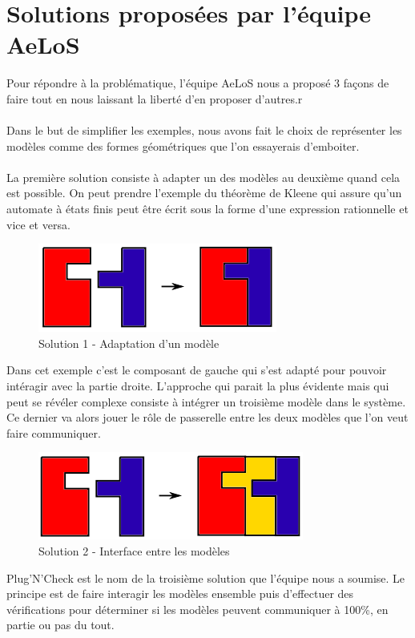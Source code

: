 \documentclass[12pt,a4paper]{report}
\begin{document}
\section{Solutions proposées par l'équipe AeLoS}\label{sec:Solutions}
Pour répondre à la problématique, l'équipe AeLoS nous a proposé 3 façons de 
faire tout en nous laissant la liberté d'en proposer d'autres.r
\\\\
Dans le but de simplifier les exemples, nous avons fait le choix de représenter 
les modèles comme des formes géométriques que l'on essayerais d'emboiter.
\\\\
La première solution consiste à adapter un des modèles au deuxième quand cela 
est possible. On peut prendre l'exemple du théorème de Kleene qui assure qu'un 
automate à états finis peut être écrit sous la forme d'une expression 
rationnelle et vice et versa.

\begin{figure}[h]
	\centering
	\includegraphics[scale=1]{ressources/solution1.png}
	\caption{Solution 1 - Adaptation d'un modèle}
\end{figure}

Dans cet exemple c'est le composant de gauche qui s'est adapté pour pouvoir intéragir
avec la partie droite.
\newpage
L'approche qui parait la plus évidente mais qui peut se révéler complexe 
consiste à intégrer un troisième modèle dans le système. Ce dernier va alors 
jouer le rôle de passerelle entre les deux modèles que l'on veut faire 
communiquer.

\begin{figure}[h]
	\centering
	\includegraphics[scale=1]{ressources/solution2.png}
	\caption{Solution 2 - Interface entre les modèles}
\end{figure}

Plug'N'Check est le nom de la troisième solution que l'équipe nous a soumise. 
Le principe est de faire interagir les modèles ensemble puis d'effectuer des 
vérifications pour déterminer si les modèles peuvent communiquer à 100\%, 
en partie ou pas du tout.
\end{document}
